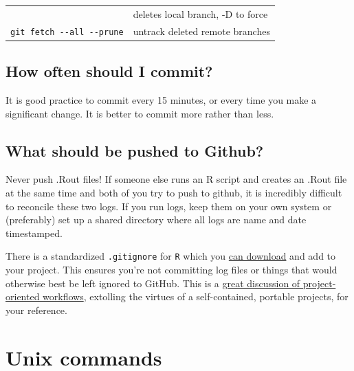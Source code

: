 \documentclass[]{book}
\begin{document}
\begin{longtable}[]{@{}ll@{}}
\begin{minipage}[t]{0.13\columnwidth}
\end{minipage} & \begin{minipage}[t]{0.22\columnwidth}\raggedright\strut
deletes local branch, -D to force\strut
\end{minipage}\tabularnewline
\begin{minipage}[t]{0.13\columnwidth}\raggedright\strut
\texttt{git\ fetch\ -\/-all\ -\/-prune}\strut
\end{minipage} & \begin{minipage}[t]{0.22\columnwidth}\raggedright\strut
untrack deleted remote branches\strut
\end{minipage}\tabularnewline
\bottomrule
\end{longtable}

\section{How often should I commit?}\label{how-often-should-i-commit}

It is good practice to commit every 15 minutes, or every time you make a
significant change. It is better to commit more rather than less.

\section{What should be pushed to
Github?}\label{what-should-be-pushed-to-github}

Never push .Rout files! If someone else runs an R script and creates an
.Rout file at the same time and both of you try to push to github, it is
incredibly difficult to reconcile these two logs. If you run logs, keep
them on your own system or (preferably) set up a shared directory where
all logs are name and date timestamped.

There is a standardized \texttt{.gitignore} for \texttt{R} which you
\href{https://github.com/github/gitignore/blob/master/R.gitignore}{can
download} and add to your project. This ensures you're not committing
log files or things that would otherwise best be left ignored to GitHub.
This is a
\href{https://www.tidyverse.org/articles/2017/12/workflow-vs-script/}{great
discussion of project-oriented workflows}, extolling the virtues of a
self-contained, portable projects, for your reference.

\hypertarget{unix}{\chapter{Unix commands}\label{unix}}
\end{document}
